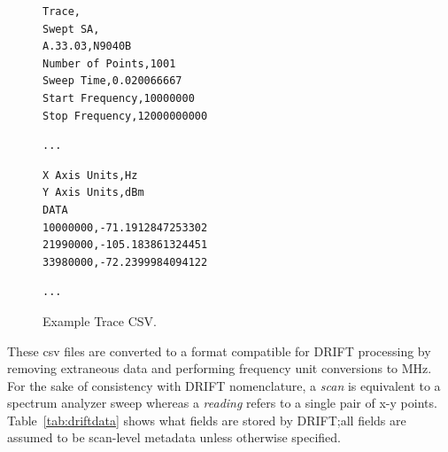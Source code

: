 \documentclass[titlepage]{article}
\begin{document}
\begin{figure}[ht]
\begin{lstlisting}[aboveskip=0pt, belowskip=0pt]
Trace,
Swept SA,
A.33.03,N9040B
Number of Points,1001
Sweep Time,0.020066667
Start Frequency,10000000
Stop Frequency,12000000000
\end{lstlisting}
\begin{lstlisting}[aboveskip=0pt, belowskip=0pt, numbers=none]
...
\end{lstlisting}
\begin{lstlisting}[aboveskip=0pt, belowskip=0pt, firstnumber=43]
X Axis Units,Hz
Y Axis Units,dBm
DATA
10000000,-71.1912847253302
21990000,-105.183861324451
33980000,-72.2399984094122
\end{lstlisting}
\begin{lstlisting}[aboveskip=0pt, belowskip=0pt, numbers=none]
...
\end{lstlisting}
\caption{Example Trace CSV.}\label{fig:csvexample}
\end{figure}

These csv files are converted to a format compatible for DRIFT processing by removing extraneous data and performing frequency unit conversions to MHz. For the sake of consistency with DRIFT nomenclature, a \textit{scan} is equivalent to a spectrum analyzer sweep whereas a \textit{reading} refers to a single pair of x-y points. Table~\ref{tab:driftdata} shows what fields are stored by DRIFT;\@ all fields are assumed to be scan-level metadata unless otherwise specified.
\end{document}
